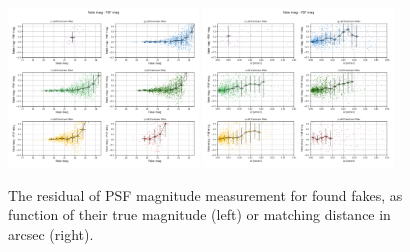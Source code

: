 \begin{figure}
    \centering
    \includegraphics[width=0.45\textwidth]{dia/figures/scatter_mag_psf_mag_perfilter.png}
    \hfil
    \includegraphics[width=0.45\textwidth]{dia/figures/scatter_dist_psf_mag_perfilter.png}
    \caption{The residual of PSF magnitude measurement for found fakes, as function of their true magnitude
    (left) or matching distance in arcsec (right).}
    \label{fig:dia_photometric_recovery}
\end{figure}

